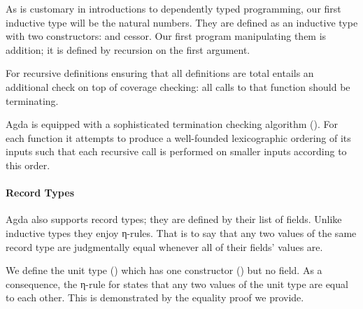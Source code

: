 As is customary in introductions to dependently typed programming, our first
inductive type will be the natural numbers. They are defined as an inductive
type with two constructors:  and cessor. Our first program
manipulating them is addition; it is defined by recursion on the first argument.

\begin{minipage}{0.5\textwidth}
\end{minipage}\begin{minipage}{0.5\textwidth}
\end{minipage}

For recursive definitions ensuring that all definitions are total entails
an additional check on top of coverage checking: all calls to that function
should be terminating.

\begin{feature} Agda is equipped with a sophisticated
termination checking algorithm (\cite{abel1998foetus}). For each function it
attempts to produce a well-founded lexicographic ordering of its inputs such
that each recursive call is performed on smaller inputs according to this
order.
\end{feature}

\paragraph{Record Types}\label{par:recordtypes}

Agda also supports record types; they are defined by their list of fields.
Unlike inductive types they enjoy η-rules. That is to say that any two
values of the same record type are judgmentally equal whenever all of their
fields' values are.

We define the unit type () which has one constructor () but no
field. As a consequence, the η-rule for  states that any two values of
the unit type are equal to each other. This is demonstrated by the equality
proof we provide.

\begin{minipage}[t]{0.5\textwidth}
\end{minipage}
\begin{minipage}[t]{0.5\textwidth}
\end{minipage}

